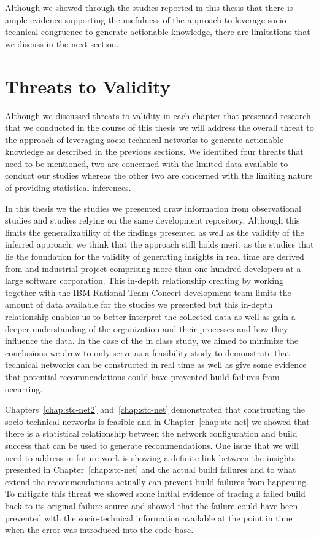 Although we showed through the studies reported in this thesis that there is ample evidence supporting the usefulness of the approach to leverage socio-technical congruence to generate actionable knowledge, there are limitations that we discuss in the next section.

\section{Threats to Validity}
Although we discussed threats to validity in each chapter that presented research that we conducted in the course of this thesis we will address the overall threat to the approach of leveraging socio-technical networks to generate actionable knowledge as described in the previous sections.
We identified four threats that need to be mentioned, two are concerned with the limited data available to conduct our studies whereas the other two are concerned with the limiting nature of providing statistical inferences.

In this thesis we the studies we presented draw information from observational studies and studies relying on the same development repository.
Although this limits the generalizability of the findings presented as well as the validity of the inferred approach, we think that the approach still holds merit as the studies that lie the foundation for the validity of generating insights in real time are derived from and industrial project comprising more than one hundred developers at a large software corporation.
This in-depth relationship creating by working together with the IBM Rational Team Concert development team limits the amount of data available for the studies we presented but this in-depth relationship enables us to better interpret the collected data as well as gain a deeper understanding of the organization and their processes and how they influence the data.
In the case of the in class study, we aimed to minimize the conclusions we drew to only serve as a feasibility study to demonstrate that technical networks can be constructed in real time as well as give some evidence that potential recommendations could have prevented build failures from occurring.

Chapters~\ref{chap:stc-net2} and~\ref{chap:stc-net} demonstrated that constructing the socio-technical networks is feasible and in Chapter~\ref{chap:stc-net} we showed that there is a statistical relationship between the network configuration and build success that can be used to generate recommendations.
One issue that we will need to address in future work is showing a definite link between the insights presented in Chapter~\ref{chap:stc-net} and the actual build failures and to what extend the recommendations actually can prevent build failures from happening.
To mitigate this threat we showed some initial evidence of tracing a failed build back to its original failure source and showed that the failure could have been prevented with the socio-technical information available at the point in time when the error was introduced into the code base.


